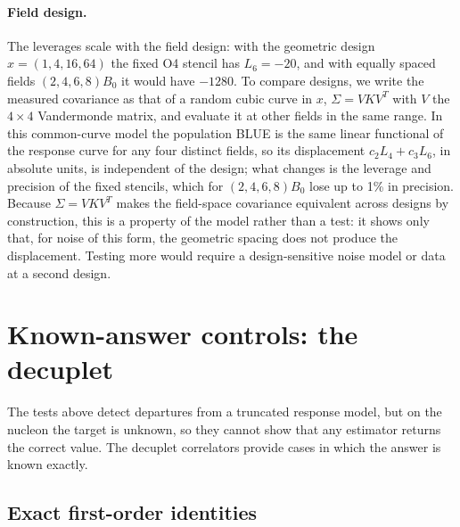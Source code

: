 \documentclass[aps,prd,preprint,nofootinbib,floatfix]{revtex4-2}
\begin{document}
\paragraph{Field design.} The leverages scale with the field design: with the geometric design $x=(1,4,16,64)$ the fixed O4 stencil has $L_6=-20$, and with equally spaced fields $(2,4,6,8)B_0$ it would have $-1280$. To compare designs, we write the measured covariance as that of a random cubic curve in $x$, $\Sigma=VKV^T$ with $V$ the $4\times4$ Vandermonde matrix, and evaluate it at other fields in the same range. In this common-curve model the population BLUE is the same linear functional of the response curve for any four distinct fields, so its displacement $c_2L_4+c_3L_6$, in absolute units, is independent of the design; what changes is the leverage and precision of the fixed stencils, which for $(2,4,6,8)B_0$ lose up to 1\% in precision. Because $\Sigma=VKV^T$ makes the field-space covariance equivalent across designs by construction, this is a property of the model rather than a test: it shows only that, for noise of this form, the geometric spacing does not produce the displacement. Testing more would require a design-sensitive noise model or data at a second design.

\section{Known-answer controls: the decuplet}
\label{sec:decuplet}

The tests above detect departures from a truncated response model, but on the nucleon the target is unknown, so they cannot show that any estimator returns the correct value. The decuplet correlators provide cases in which the answer is known exactly.

\subsection{Exact first-order identities}
\end{document}
